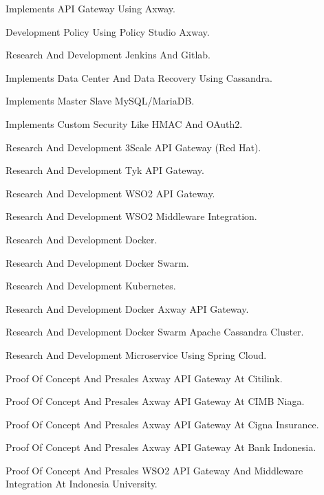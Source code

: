 \documentclass[english]{cv-style}
\begin{document}
\begin{entrylist}
{\begin{itemize}
{    \item Implements API Gateway Using Axway.
    \item Development Policy Using Policy Studio Axway.
    \item Research And Development Jenkins And Gitlab.
    \item Implements Data Center And Data Recovery Using Cassandra.
    \item Implements Master Slave MySQL/MariaDB.
    \item Implements Custom Security Like HMAC And OAuth2.
    \item Research And Development 3Scale API Gateway (Red Hat).
    \item Research And Development Tyk API Gateway.
    \item Research And Development WSO2 API Gateway.
    \item Research And Development WSO2 Middleware Integration.
    \item Research And Development Docker.
    \item Research And Development Docker Swarm.
    \item Research And Development Kubernetes.
    \item Research And Development Docker Axway API Gateway.
    \item Research And Development Docker Swarm Apache Cassandra Cluster.
    \item Research And Development Microservice Using Spring Cloud.
    \item Proof Of Concept And Presales Axway API Gateway At Citilink.
    \item Proof Of Concept And Presales Axway API Gateway At CIMB Niaga.
    \item Proof Of Concept And Presales Axway API Gateway At Cigna Insurance.
    \item Proof Of Concept And Presales Axway API Gateway At Bank Indonesia.
    \item Proof Of Concept And Presales WSO2 API Gateway And Middleware Integration At Indonesia University.}
  \end{itemize}}
\end{entrylist}
\end{document}
